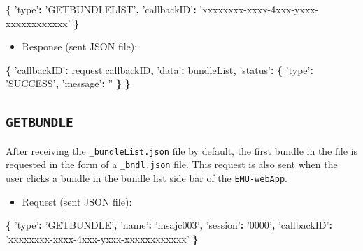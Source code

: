 \documentclass[]{book}
\newenvironment{Shaded}{\begin{snugshade}}{\end{snugshade}}
\newcommand{\AttributeTok}[1]{\textcolor[rgb]{0.77,0.63,0.00}{#1}}
\newcommand{\NormalTok}[1]{#1}
\newcommand{\OperatorTok}[1]{\textcolor[rgb]{0.81,0.36,0.00}{\textbf{#1}}}
\newcommand{\StringTok}[1]{\textcolor[rgb]{0.31,0.60,0.02}{#1}}
\newcommand{\VariableTok}[1]{\textcolor[rgb]{0.00,0.00,0.00}{#1}}
\providecommand{\tightlist}{%
  \setlength{\itemsep}{0pt}\setlength{\parskip}{0pt}}
\theoremstyle{definition}
\theoremstyle{definition}
\theoremstyle{definition}
\theoremstyle{remark}
\begin{document}
\begin{Shaded}
\begin{Highlighting}[]
\OperatorTok{\{}
  \StringTok{'type'}\OperatorTok{:} \StringTok{'GETBUNDLELIST'}\OperatorTok{,}
  \StringTok{'callbackID'}\OperatorTok{:} \StringTok{'xxxxxxxx-xxxx-4xxx-yxxx-xxxxxxxxxxxx'}
\OperatorTok{\}}
\end{Highlighting}
\end{Shaded}

\begin{itemize}
\tightlist
\item
  Response (sent JSON file):
\end{itemize}

\begin{Shaded}
\begin{Highlighting}[]
\OperatorTok{\{}
  \StringTok{'callbackID'}\OperatorTok{:} \VariableTok{request}\NormalTok{.}\AttributeTok{callbackID}\OperatorTok{,}
  \StringTok{'data'}\OperatorTok{:}\NormalTok{ bundleList}\OperatorTok{,}
  \StringTok{'status'}\OperatorTok{:} \OperatorTok{\{}
    \StringTok{'type'}\OperatorTok{:} \StringTok{'SUCCESS'}\OperatorTok{,}
    \StringTok{'message'}\OperatorTok{:} \StringTok{''}
  \OperatorTok{\}}
\OperatorTok{\}}
\end{Highlighting}
\end{Shaded}

\hypertarget{getbundle}{%
\subsection{\texorpdfstring{\texttt{GETBUNDLE}}{GETBUNDLE}}\label{getbundle}}

After receiving the \texttt{\_bundleList.json} file by default, the
first bundle in the file is requested in the form of a
\texttt{\_bndl.json} file. This request is also sent when the user
clicks a bundle in the bundle list side bar of the \texttt{EMU-webApp}.

\begin{itemize}
\tightlist
\item
  Request (sent JSON file):
\end{itemize}

\begin{Shaded}
\begin{Highlighting}[]
\OperatorTok{\{}
  \StringTok{'type'}\OperatorTok{:} \StringTok{'GETBUNDLE'}\OperatorTok{,}
  \StringTok{'name'}\OperatorTok{:} \StringTok{'msajc003'}\OperatorTok{,}
  \StringTok{'session'}\OperatorTok{:} \StringTok{'0000'}\OperatorTok{,}
  \StringTok{'callbackID'}\OperatorTok{:} \StringTok{'xxxxxxxx-xxxx-4xxx-yxxx-xxxxxxxxxxxx'}
\OperatorTok{\}}
\end{Highlighting}
\end{Shaded}
\end{document}

